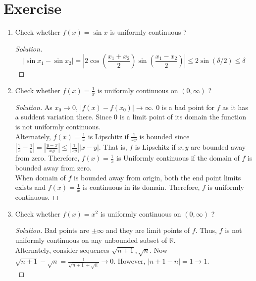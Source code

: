\section*{Exercise}
\begin{enumerate}
	\item Check whether $f(x) = \sin x$ is uniformly continuous ?
	\begin{proof}[Solution]
		$$ |\sin x_1 - \sin x_2| = \left|2\cos\left(\frac{x_1+x_2}{2}\right)\sin\left(\frac{x_1-x_2}{2}\right)\right| \le 2\sin(\delta/2) \le \delta $$
	\end{proof}
	\item Check whether $f(x) = \frac{1}{x}$ is uniformly continuous on $(0,\infty)$ ?
	\begin{proof}[Solution]
		As $x_0 \to 0$, $|f(x)-f(x_0)| \to \infty$.
		$0$ is a bad point for $f$ as it has a suddent variation there. Since $0$ is a limit point of its domain the function is not uniformly continuous.\\

		Alternately, $f(x) = \frac{1}{x}$ is Lipschitz if $\frac{1}{xy}$ is bounded since $|\frac{1}{x}-\frac{1}{y}| = | \frac{y-x}{xy} | \le |\frac{1}{xy}| |x-y|$. That is, $f$ is Lipschitz if $x,y$ are bounded away from zero. Therefore, $f(x) = \frac{1}{x}$ is Uniformly continuous if the domain of $f$ is bounded away from zero.\\

		When domain of $f$ is bounded away from origin, both the end point limits exists and $f(x)=\frac{1}{x}$ is continuous in its domain. Therefore, $f$ is uniformly continuous.
	\end{proof}
	\item Check whether $f(x) = x^2$ is uniformly continuous on $(0,\infty)$ ?
	\begin{proof}[Solution]
		Bad points are $\pm \infty$ and they are limit points of $f$. Thus, $f$ is not uniformly continuous on any unbounded subset of $\mathbb{R}$.\\

		Alternately, consider sequences $\sqrt{n+1}, \sqrt{n}$. Now $\sqrt{n+1} - \sqrt{n} = \frac{1}{\sqrt{n+1}+\sqrt{n}} \to 0$. However, $|n+1-n| = 1 \to 1$.\\


\end{proof}
\end{enumerate}
